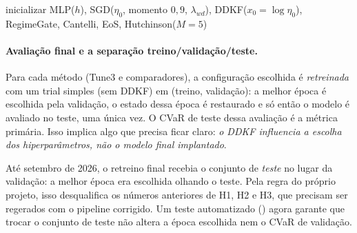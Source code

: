 \begin{algorithm}[H]
\caption{Um trial do Tune3 ()}
inicializar MLP($h$), SGD($\eta_0$, momento $0{,}9$, $\lambda_{wd}$), DDKF($x_0=\log\eta_0$), RegimeGate, Cantelli, EoS, Hutchinson($M=5$)\;
\end{algorithm}

\paragraph{Avaliação final e a separação treino/validação/teste.} Para cada método (Tune3 e comparadores), a configuração escolhida é \emph{retreinada} com um trial simples (sem DDKF) em (treino, validação): a melhor época é escolhida pela validação, o estado dessa época é restaurado e só então o modelo é avaliado no teste, uma única vez. O CVaR de teste dessa avaliação é a métrica primária. Isso implica algo que precisa ficar claro: \emph{o DDKF influencia a escolha dos hiperparâmetros, não o modelo final implantado}.

\begin{alerta}
Até setembro de 2026, o retreino final recebia o conjunto de \emph{teste} no lugar da validação: a melhor época era escolhida olhando o teste. Pela regra do próprio projeto, isso desqualifica os números anteriores de H1, H2 e H3, que precisam ser regerados com o pipeline corrigido. Um teste automatizado () agora garante que trocar o conjunto de teste não altera a época escolhida nem o CVaR de validação.
\end{alerta}

